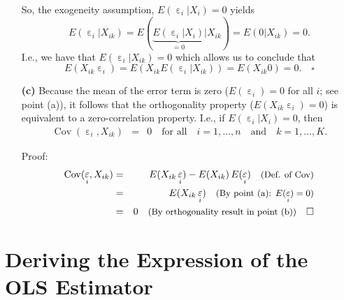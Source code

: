 \documentclass[
  14pt,
]{memoir}
\DeclareMathOperator{\Cov}{Cov}
\DeclareMathOperator{\eps}{\varepsilon}
\begin{document}
\begin{itemize}
\begin{mdframed}[hidealllines=true,backgroundcolor=blue!20]
So, the exogeneity assumption, $E(\eps_i|X_i)=0$ yields
$$E(\eps_i|X_{ik})=E(\underbrace{E(\eps_i|X_i)}_{=0}|X_{ik})=E(0|X_{ik})=0.$$
I.e., we have that $E(\eps_i|X_{ik})=0$ which allows us to conclude that
$$E(X_{ik}\eps_i)=E(X_{ik}E(\eps_i|X_{ik}))=E(X_{ik}0)=0.\quad\square$$
\end{mdframed}
\item[\textbf{(c)}] Because the mean of the error term is zero ($E(\eps_i)=0$ for all $i$; see point (a)), it follows that the orthogonality property ($E(X_{ik}\eps_i)=0$) is equivalent to a zero-correlation property.  I.e., if $E(\eps_i|X_{i})=0$, then 
\begin{eqnarray*}
  \Cov(\eps_i,X_{ik})&=&0\quad\text{for all}\quad i=1,\dots,n\quad\text{and}\quad k=1,\dots,K.
\end{eqnarray*}
\begin{mdframed}[hidealllines=true,backgroundcolor=blue!20]
Proof: %
\begin{eqnarray*}
  \Cov(\eps_i,X_{ik})&=&E(X_{ik}\eps_i)-E(X_{ik})\,E(\eps_i)\quad{\small\text{(Def. of Cov)}}\\
  &=&E(X_{ik}\eps_i)\quad{\small\text{(By point (a): $E(\eps_i)=0$)}}\\
  &=&0\quad{\small\text{(By orthogonality result in point (b))}}\quad\square
\end{eqnarray*}
\end{mdframed}
\end{itemize}

\hypertarget{deriving-the-expression-of-the-ols-estimator}{%
\section{Deriving the Expression of the OLS Estimator}\label{deriving-the-expression-of-the-ols-estimator}}
\end{document}
